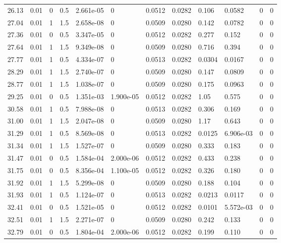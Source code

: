 \documentclass[preview]{standalone}
\begin{document}
{{{\begin{tabular}{L{1.2cm}C{1.2cm} C{0.3cm}C{0.5cm} C{1.4cm}C{1.4cm} C{1.4cm}C{1.4cm} C{1.6cm}C{1.6cm} C{1.6cm}C{1.6cm}}
  26.13  &  0.01  & 0     & 0.5 &  2.661e-05  & 0  &  0.0512&   0.0282& 0.106 & 0.0582   &  0 & 0  \\ 
  27.04  &  0.01  & 1     & 1.5 &  2.658e-08  & 0  &  0.0509&   0.0280& 0.142 & 0.0782   &  0 & 0  \\ 
  27.36  &  0.01  & 0     & 0.5 &  3.347e-05  & 0  &  0.0512&   0.0282& 0.277 & 0.152   &  0 & 0  \\ 
  27.64  &  0.01  & 1     & 1.5 &  9.349e-08  & 0  &  0.0509&   0.0280& 0.716 & 0.394   &  0 & 0  \\ 
  27.77  &  0.01  & 1     & 0.5 &  4.334e-07  & 0  &  0.0513&   0.0282& 0.0304 & 0.0167   &  0 & 0  \\ 
  28.29  &  0.01  & 1     & 1.5 &  2.740e-07  & 0  &  0.0509&   0.0280& 0.147 & 0.0809   &  0 & 0  \\ 
  28.77  &  0.01  & 1     & 1.5 &  1.038e-07  & 0  &  0.0509&   0.0280& 0.175 & 0.0963   &  0 & 0  \\ 
  29.25  &  0.01  & 0     & 0.5 &  1.351e-03  & 1.900e-05  &  0.0512&   0.0282& 1.05 & 0.575   &  0 & 0  \\ 
  30.58  &  0.01  & 1     & 0.5 &  7.988e-08  & 0  &  0.0513&   0.0282& 0.306 & 0.169   &  0 & 0  \\ 
  31.00  &  0.01  & 1     & 1.5 &  2.047e-08  & 0  &  0.0509&   0.0280& 1.17 & 0.643   &  0 & 0  \\ 
  31.29  &  0.01  & 1     & 0.5 &  8.569e-08  & 0  &  0.0513&   0.0282& 0.0125 & 6.906e-03   &  0 & 0  \\ 
  31.34  &  0.01  & 1     & 1.5 &  1.527e-07  & 0  &  0.0509&   0.0280& 0.333 & 0.183   &  0 & 0  \\ 
  31.47  &  0.01  & 0     & 0.5 &  1.584e-04  & 2.000e-06  &  0.0512&   0.0282& 0.433 & 0.238   &  0 & 0  \\ 
  31.75  &  0.01  & 0     & 0.5 &  8.356e-04  & 1.100e-05  &  0.0512&   0.0282& 0.326 & 0.180   &  0 & 0  \\ 
  31.92  &  0.01  & 1     & 1.5 &  5.299e-08  & 0  &  0.0509&   0.0280& 0.188 & 0.104   &  0 & 0  \\ 
  31.93  &  0.01  & 1     & 0.5 &  1.124e-07  & 0  &  0.0513&   0.0282& 0.0213 & 0.0117   &  0 & 0  \\ 
  32.41  &  0.01  & 0     & 0.5 &  1.521e-05  & 0  &  0.0512&   0.0282& 0.0101 & 5.572e-03   &  0 & 0  \\ 
  32.51  &  0.01  & 1     & 1.5 &  2.271e-07  & 0  &  0.0509&   0.0280& 0.242 & 0.133   &  0 & 0  \\ 
  32.79  &  0.01  & 0     & 0.5 &  1.804e-04  & 2.000e-06  &  0.0512&   0.0282& 0.199 & 0.110   &  0 & 0  \\ 

\end{tabular}}}}
\end{document}
